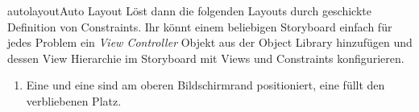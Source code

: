 \documentclass[parskip=half, final]{scrreprt}
\begin{document}
\begin{lecture}
\begin{exc}
\begin{excitem}{autolayout}{Auto Layout}
Löst dann die folgenden Layouts durch geschickte Definition von Constraints. Ihr könnt einem beliebigen Storyboard einfach für jedes Problem ein \emph{View Controller} Objekt aus der Object Library hinzufügen und dessen View Hierarchie im Storyboard mit Views und Constraints konfigurieren.


\begin{enumerate}

\item Eine  und eine  sind am oberen Bildschirmrand positioniert, eine  füllt den verbliebenen Platz.


\end{enumerate}
\end{excitem}
\end{exc}
\end{lecture}
\end{document}

